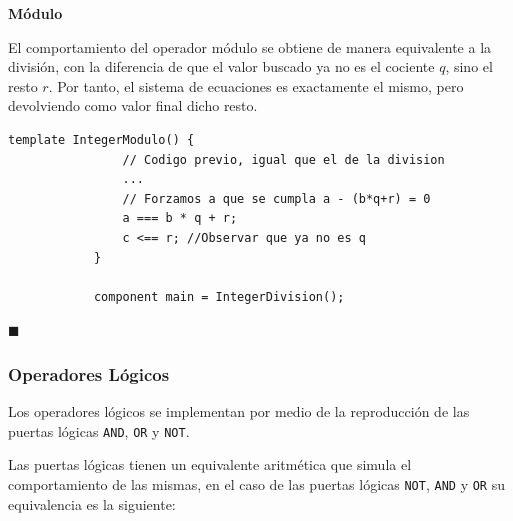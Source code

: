 \documentclass[a4paper,12pt]{report}
\begin{document}
	\vspace{0.6cm}
	\noindent \textbf{Módulo}
	\vspace{0.2cm}
	
	\label{sss:modulo}
	
	\noindent El comportamiento del operador módulo se obtiene de manera equivalente a la división, con la diferencia de que el valor buscado ya no es el cociente $q$, sino el resto $r$. Por tanto, el sistema de ecuaciones es exactamente el mismo, pero devolviendo como valor final dicho resto.
	
	\vspace{0.2cm}
	
	\vspace{0.3cm}
	\begin{mi_ejemplo}
		\caption{Pseudocódigo módulo}
		\label{ex:pseudocodigo-mod}
		\begin{lstlisting}[language=Circom]
			template IntegerModulo() {
				// Codigo previo, igual que el de la division
				...
				// Forzamos a que se cumpla a - (b*q+r) = 0
				a === b * q + r;
				c <== r; //Observar que ya no es q 
			}
			
			component main = IntegerDivision();
		\end{lstlisting}
		
		\hspace*{\fill} $\blacksquare$
	\end{mi_ejemplo}
	
	
	\subsubsection{Operadores Lógicos}
	
	\vspace{0.2cm}
	\noindent Los operadores lógicos se implementan por medio de la reproducción de las puertas lógicas \texttt{AND}, \texttt{OR} y \texttt{NOT}. 
	
	\vspace{0.2cm}
	\noindent Las puertas lógicas tienen un equivalente aritmética que simula el comportamiento de las mismas, en el caso de las puertas lógicas \texttt{NOT}, \texttt{AND} y \texttt{OR} su equivalencia es la siguiente:
	
\end{document}
